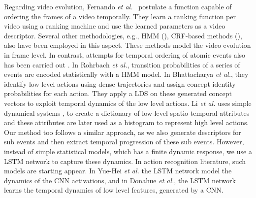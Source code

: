 Regarding video evolution, Fernando \textit{et al.}~\cite{fernando2015modeling} postulate
a function capable of ordering the frames of a video
temporally. They learn a ranking function per video using a ranking machine and use the learned parameters as
a video descriptor. Several other methodologies, e.g., HMM (\cite{wang2011hidden, wu2014leveraging}),
CRF-based methods (\cite{song2013action}), also have been employed in this aspect. These methods model the video evolution in frame
level. In contrast, attempts for temporal ordering of atomic events also has been carried out \cite{rohrbach2012script, bhattacharya2014recognition}.
In Rohrbach \textit{et al.}\cite{rohrbach2012script}, transition probabilities of a series of events are encoded statistically with a HMM model.
In Bhattacharya \textit{et al.}\cite{bhattacharya2014recognition}, they identify low level actions using dense trajectories and assign concept identity
probabilities for each action. They apply a LDS on these generated concept vectors to exploit temporal
dynamics of the low level actions. Li \textit{et al.}\cite{li2013recognizing} uses simple dynamical systems \cite{jackson1992perspectives},
\cite{kailath1974view} to create a dictionary of low-level spatio-temporal attributes and these attributes
are later used as a histogram to represent high level actions. Our method too follows a similar approach,
as we also generate descriptors for sub events and then extract temporal progression
of these sub events. However, instead of simple statistical models, which has a finite dynamic response,
we use a LSTM network \cite{hochreiter1997long} to capture these dynamics. In action recognition literature,
such models are starting appear. In Yue-Hei \textit{et al.}
\cite{yue2015beyond} the LSTM network model the dynamics of the CNN activations, and in Donahue \textit{et al.}\cite{donahue2015long},
the LSTM network learns the temporal dynamics of low level features, generated by a CNN.


